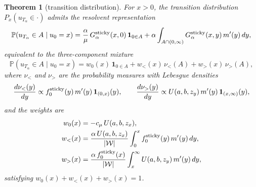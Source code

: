 \documentclass[aap,preprint]{imsart}
\numberwithin{equation}{section}
\theoremstyle{plain}
\newtheorem{theorem}{Theorem}[section]
\theoremstyle{definition}
\begin{document}
\begin{theorem}[transition distribution]\label{thm:transition-dist}
  For $x>0$, the transition distribution $P_x(u_{T_\alpha}\in\cdot)$
  admits the resolvent representation
  \begin{equation}\label{eq:trans}
    \mathbb{P}(u_{T_\alpha}\in A\mid u_0=x)
    = \frac{\alpha}{\mu}\,G^{\rm sticky}_\alpha(x,0)\,\mathbf{1}_{0\in A}
    + \alpha\int_{A\cap(0,\infty)} G^{\rm sticky}_\alpha(x,y)\,m'(y)\,dy,
  \end{equation}
  equivalent to the three-component mixture
  \begin{equation}\label{eq:trans-mixture}
    \mathbb P(u_{T_\alpha}\in A\mid u_0=x)
    = w_0(x)\,\mathbf{1}_{0\in A}
    + w_<(x)\,\nu_<(A)
    + w_>(x)\,\nu_>(A),
  \end{equation}
  where $\nu_<$ and $\nu_>$ are the probability measures with Lebesgue
  densities
  \[
    \frac{d\nu_<(y)}{dy}  \propto  f_0^{\rm sticky}(y)\,m'(y)\,\mathbf{1}_{(0,x)}(y),
    \qquad
    \frac{d\nu_>(y)}{dy}  \propto  U(a,b,z_y)\,m'(y)\,\mathbf{1}_{(x,\infty)}(y),
  \]
  and the weights are
  \begin{align}
    w_0(x) &= -c_\mu\,U(a,b,z_x), \label{eq:w0}\\
    w_<(x) &= \frac{\alpha\,U(a,b,z_x)}{|\mathcal{W}|}
               \int_0^x f_0^{\rm sticky}(y)\,m'(y)\,dy, \label{eq:wlt}\\
    w_>(x) &= \frac{\alpha\,f_0^{\rm sticky}(x)}{|\mathcal{W}|}
               \int_x^\infty U(a,b,z_y)\,m'(y)\,dy, \label{eq:wgt}
  \end{align}
  satisfying $w_0(x)+w_<(x)+w_>(x)=1$.
\end{theorem}
\end{document}
